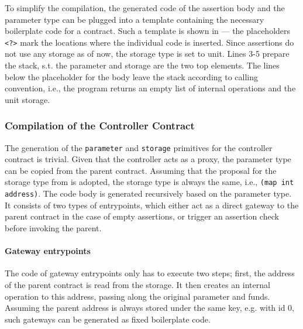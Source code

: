 To simplify the compilation, the generated code of the assertion body and the parameter type can be plugged into a template containing the necessary boilerplate code for a contract. Such a template is shown in  --- the placeholders \texttt{<?>} mark the locations where the individual code is inserted. Since assertions do not use any storage as of now, the storage type is set to unit. Lines 3-5 prepare the stack, s.t. the parameter and storage are the two top elements. The lines below the placeholder for the body leave the stack according to calling convention, i.e., the program returns an empty list of internal operations and the unit storage.


\subsubsection{Compilation of the Controller Contract}
The generation of the \texttt{parameter} and \texttt{storage} primitives for the controller contract is trivial. Given that the controller acts as a proxy, the parameter type can be copied from the parent contract. Assuming that the proposal for the storage type from  is adopted, the storage type is always the same, i.e., \texttt{(map int address)}. The code body is generated recursively based on the parameter type. It consists of two types of entrypoints, which either act as a direct gateway to the parent contract in the case of empty assertions, or trigger an assertion check before invoking the parent.

\paragraph{Gateway entrypoints}
The code of gateway entrypoints only has to execute two steps; first, the address of the parent contract is read from the storage. It then creates an internal operation to this address, passing along the original parameter and funds. Assuming the parent address is always stored under the same key, e.g. with id 0, such gateways can be generated as fixed boilerplate code.

